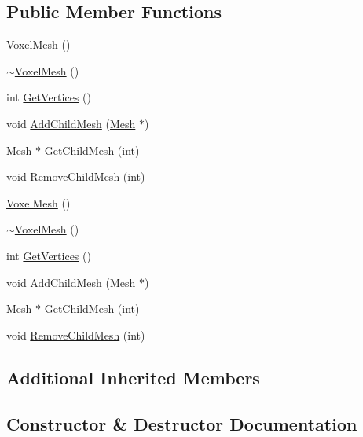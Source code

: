 \subsection*{Public Member Functions}
\begin{DoxyCompactItemize}
\item 
\mbox{\hyperlink{class_voxel_mesh_a700f305d3ec0fba1230dc648ab638559}{Voxel\+Mesh}} ()
\item 
\mbox{\hyperlink{class_voxel_mesh_afc295113483555b4784301a80870a77e}{$\sim$\+Voxel\+Mesh}} ()
\item 
int \mbox{\hyperlink{class_voxel_mesh_a6a06be81275f5e98f77382ee9dfe9a07}{Get\+Vertices}} ()
\item 
void \mbox{\hyperlink{class_voxel_mesh_a08d451f7ec199e9dcab9ab5ee0646b28}{Add\+Child\+Mesh}} (\mbox{\hyperlink{class_mesh}{Mesh}} $\ast$)
\item 
\mbox{\hyperlink{class_mesh}{Mesh}} $\ast$ \mbox{\hyperlink{class_voxel_mesh_add1b9e40018be0b534747a6addee981d}{Get\+Child\+Mesh}} (int)
\item 
void \mbox{\hyperlink{class_voxel_mesh_ae86555f2df9a4ba3b21b62a4bd26b591}{Remove\+Child\+Mesh}} (int)
\item 
\mbox{\hyperlink{class_voxel_mesh_a700f305d3ec0fba1230dc648ab638559}{Voxel\+Mesh}} ()
\item 
\mbox{\hyperlink{class_voxel_mesh_afc295113483555b4784301a80870a77e}{$\sim$\+Voxel\+Mesh}} ()
\item 
int \mbox{\hyperlink{class_voxel_mesh_a6a06be81275f5e98f77382ee9dfe9a07}{Get\+Vertices}} ()
\item 
void \mbox{\hyperlink{class_voxel_mesh_a08d451f7ec199e9dcab9ab5ee0646b28}{Add\+Child\+Mesh}} (\mbox{\hyperlink{class_mesh}{Mesh}} $\ast$)
\item 
\mbox{\hyperlink{class_mesh}{Mesh}} $\ast$ \mbox{\hyperlink{class_voxel_mesh_ad8ef76698c07a4531ccdf7de9408f903}{Get\+Child\+Mesh}} (int)
\item 
void \mbox{\hyperlink{class_voxel_mesh_ae86555f2df9a4ba3b21b62a4bd26b591}{Remove\+Child\+Mesh}} (int)
\end{DoxyCompactItemize}
\subsection*{Additional Inherited Members}


\subsection{Constructor \& Destructor Documentation}
\mbox{\label{class_voxel_mesh_a700f305d3ec0fba1230dc648ab638559}} 
